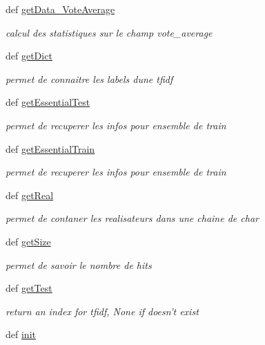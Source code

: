 \begin{DoxyCompactItemize}
def \hyperlink{namespacetoolsBDD_a1815eb69cbba2e6abc16b649baa2fdad}{get\-Data\-\_\-\-Vote\-Average}
\begin{DoxyCompactList}\small\item\em calcul des statistiques sur le champ vote\-\_\-average \end{DoxyCompactList}\item 
def \hyperlink{namespacetoolsBDD_aef96b5903d59864e793f4377d82bac25}{get\-Dict}
\begin{DoxyCompactList}\small\item\em permet de connaitre les labels dune tfidf \end{DoxyCompactList}\item 
def \hyperlink{namespacetoolsBDD_abc6b8127dc8f28edc53d719a4835bfa3}{get\-Essential\-Test}
\begin{DoxyCompactList}\small\item\em permet de recuperer les infos pour ensemble de train \end{DoxyCompactList}\item 
def \hyperlink{namespacetoolsBDD_ab85cfda40b715e400dda4a5e5c97f9ce}{get\-Essential\-Train}
\begin{DoxyCompactList}\small\item\em permet de recuperer les infos pour ensemble de train \end{DoxyCompactList}\item 
def \hyperlink{namespacetoolsBDD_ad9d092a50decbd07a5130e144731caa9}{get\-Real}
\begin{DoxyCompactList}\small\item\em permet de contaner les realisateurs dans une chaine de char \end{DoxyCompactList}\item 
def \hyperlink{namespacetoolsBDD_ae224e914a0d4d23030401af6e59cb1bc}{get\-Size}
\begin{DoxyCompactList}\small\item\em permet de savoir le nombre de hits \end{DoxyCompactList}\item 
def \hyperlink{namespacetoolsBDD_a49928e1495cbb0687a8656f3c5481d5b}{get\-Test}
\begin{DoxyCompactList}\small\item\em return an index for tfidf, None if doesn't exist \end{DoxyCompactList}\item 
def \hyperlink{namespacetoolsBDD_ae5e38adc6d6db8e1ece60d2bc307a39f}{init}

\end{DoxyCompactItemize}
